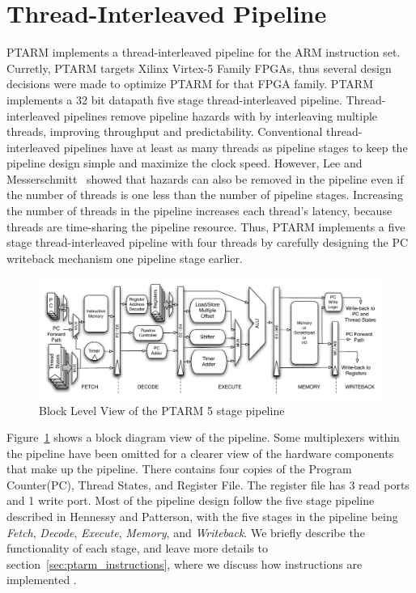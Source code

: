 \section{Thread-Interleaved Pipeline}
PTARM implements a thread-interleaved pipeline for the ARM instruction set.
Curretly, PTARM targets Xilinx Virtex-5 Family FPGAs, thus several design decisions were made to optimize PTARM for that FPGA family.
PTARM implements a 32 bit datapath five stage thread-interleaved pipeline.
Thread-interleaved pipelines remove pipeline hazards with by interleaving multiple threads, improving throughput and predictability. 
Conventional thread-interleaved pipelines have at least as many threads as pipeline stages to keep the pipeline design simple and maximize the clock speed.
However, Lee and Messerschmitt~\cite{lee1987pip} showed that hazards can also be removed in the pipeline even if the number of threads is one less than the number of pipeline stages.  
Increasing the number of threads in the pipeline increases each thread's latency, because threads are time-sharing the pipeline resource. 
Thus, PTARM implements a five stage thread-interleaved pipeline with four threads by carefully designing the PC writeback mechanism one pipeline stage earlier.

\begin{figure}[b]
  \vspace{-20pt}
  \begin{center}
    \includegraphics[scale=.54]{figs/ptarm_pipeline_five_stage}
  \end{center}
  \vspace{-20pt}
  \caption{Block Level View of the PTARM 5 stage pipeline}
  \label{fig:ptarm_pipeline_five_stage}
\end{figure}

Figure~\ref{fig:ptarm_pipeline_five_stage} shows a block diagram view of the pipeline. 
Some multiplexers within the pipeline have been omitted for a clearer view of the hardware components that make up the pipeline.
There contains four copies of the Program Counter(PC), Thread States, and Register File.
The register file has 3 read ports and 1 write port.
Most of the pipeline design follow the five stage pipeline described in Hennessy and Patterson, with the five stages in the pipeline being \emph{Fetch}, \emph{Decode}, \emph{Execute}, \emph{Memory}, and \emph{Writeback}.
We briefly describe the functionality of each stage, and leave more details to section~\ref{sec:ptarm_instructions}, where we discuss how instructions are implemented .

